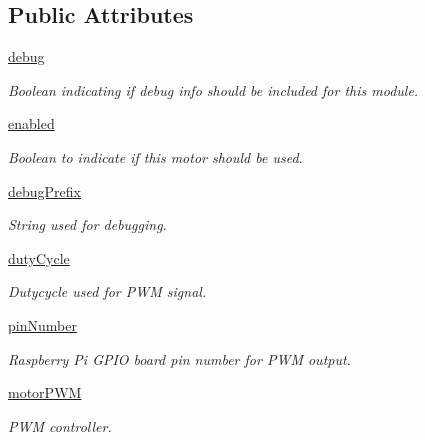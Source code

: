 \subsection*{Public Attributes}
\begin{DoxyCompactItemize}
\item 
\mbox{\label{classSabertooth2x60_1_1Sabertooth2x60_a588c512c2c66e885018024dd1f5785e1}} 
\hyperlink{classSabertooth2x60_1_1Sabertooth2x60_a588c512c2c66e885018024dd1f5785e1}{debug}
\begin{DoxyCompactList}\small\item\em Boolean indicating if debug info should be included for this module. \end{DoxyCompactList}\item 
\hyperlink{classSabertooth2x60_1_1Sabertooth2x60_ade2a3348f9fd5f960b679baa0651ce4c}{enabled}
\begin{DoxyCompactList}\small\item\em Boolean to indicate if this motor should be used. \end{DoxyCompactList}\item 
\mbox{\label{classSabertooth2x60_1_1Sabertooth2x60_a082a578ec5bdfb815b18f857369ee2a2}} 
\hyperlink{classSabertooth2x60_1_1Sabertooth2x60_a082a578ec5bdfb815b18f857369ee2a2}{debug\+Prefix}
\begin{DoxyCompactList}\small\item\em String used for debugging. \end{DoxyCompactList}\item 
\hyperlink{classSabertooth2x60_1_1Sabertooth2x60_a34c1bb9f34b39e987f4139754fb074d4}{duty\+Cycle}
\begin{DoxyCompactList}\small\item\em Dutycycle used for P\+WM signal. \end{DoxyCompactList}\item 
\mbox{\label{classSabertooth2x60_1_1Sabertooth2x60_a4813f129bd6fceeeb3a9b7bf9469f712}} 
\hyperlink{classSabertooth2x60_1_1Sabertooth2x60_a4813f129bd6fceeeb3a9b7bf9469f712}{pin\+Number}
\begin{DoxyCompactList}\small\item\em Raspberry Pi G\+P\+IO board pin number for P\+WM output. \end{DoxyCompactList}\item 
\mbox{\label{classSabertooth2x60_1_1Sabertooth2x60_aefa0f24529e5785871a23f63a6e8cf2d}} 
\hyperlink{classSabertooth2x60_1_1Sabertooth2x60_aefa0f24529e5785871a23f63a6e8cf2d}{motor\+P\+WM}
\begin{DoxyCompactList}\small\item\em P\+WM controller. \end{DoxyCompactList}\end{DoxyCompactItemize}


